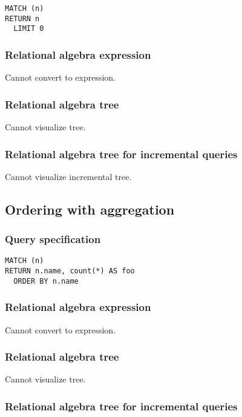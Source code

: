 \begin{lstlisting}
MATCH (n)
RETURN n
  LIMIT 0
\end{lstlisting}

\subsubsection*{Relational algebra expression}

Cannot convert to expression.

\subsubsection*{Relational algebra tree}

Cannot visualize tree.

\subsubsection*{Relational algebra tree for incremental queries}

Cannot visualize incremental tree.

\subsection{Ordering with aggregation}

\subsubsection*{Query specification}

\begin{lstlisting}
MATCH (n)
RETURN n.name, count(*) AS foo
  ORDER BY n.name
\end{lstlisting}

\subsubsection*{Relational algebra expression}

Cannot convert to expression.

\subsubsection*{Relational algebra tree}

Cannot visualize tree.

\subsubsection*{Relational algebra tree for incremental queries}

